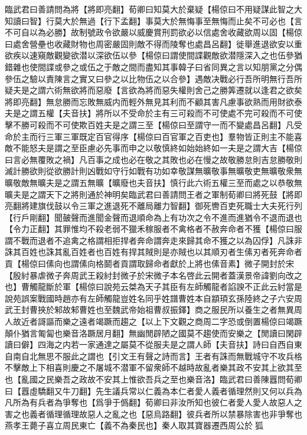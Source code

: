 臨武君曰善請問為將【將即亮翻】荀卿曰知莫大於棄疑【楊倞曰不用疑謀此智之大知讀曰智】行莫大於無過【行下孟翻】事莫大於無悔事至無悔而止矣不可必也【言不可自以為必勝】故制號政令欲嚴以威慶賞刑罰欲必以信處舍收藏欲周以固【楊倞曰處舍營壘也收藏財物也周密嚴固則敵不得而陵奪也處昌呂翻】徙舉進退欲安以重欲疾以速窺敵觀變欲潜以深欲伍以參【楊倞曰謂使間諜觀敵欲潜隱深入之也伍參猶錯雜也使間諜或參之或伍之于敵之間而盡知其事韓子曰省同異之言以知朋黨之分偶參伍之驗以責陳言之實又曰參之以比物伍之以合參】遇敵决戰必行吾所明無行吾所疑夫是之謂六術無欲將而惡廢【言欲為將而惡失權則舍己之勝筭遷就以逢君之欲矣將即亮翻】無怠勝而忘敗無威内而輕外無見其利而不顧其害凡慮事欲熟而用財欲泰夫是之謂五權【夫音扶】將所以不受命於主有三可殺而不可使處不完可殺而不可使擊不勝可殺而不可使欺百姓夫是之謂三至【楊倞曰至謂守一而不變處昌呂翻】凡受命於主而行三軍三軍既定百官得序【楊倞曰百官軍之百吏也】羣物皆正則主不能喜敵不能怒夫是謂之至臣慮必先事而申之以敬慎終如始始終如一夫是之謂大吉【楊倞曰言必無覆敗之禍】凡百事之成也必在敬之其敗也必在慢之故敬勝怠則吉怠勝敬則滅計勝欲則從欲勝計則凶戰如守行如戰有功如幸敬謀無曠敬事無曠敬吏無曠敬衆無曠敬敵無曠夫是之謂五無曠【曠廢也夫音扶】慎行此六術五權三至而處之以恭敬無曠夫是之謂天下之將則通於神明矣臨武君曰善請問王者之軍制荀卿曰將死鼓【將即亮翻將建旗伐鼓以令三軍之進退死不離局離力智翻】御死轡百吏死職士大夫死行列【行戶剛翻】聞皷聲而進聞金聲而退順命為上有功次之令不進而進猶令不退而退也【令力正翻】其罪惟均不殺老弱不獵禾稼服者不禽格者不赦奔命者不獲【楊倞曰服謂不戰而退者不追禽之格謂相拒捍者奔命謂奔走來歸其命不獲之以為囚俘】凡誅非誅其百姓也誅其亂百姓者也百姓有捍其賊則是亦賊也以其順刃者生傃刃者死奔命者貢【楊倞曰傃向也謂傃向格鬬者貢謂取歸命者獻於上將也傃音素】微子開封於宋【殷紂暴虐微子奔周武王殺紂封微子於宋微子本名啓此云開者蓋漢景帝諱劉向改之也】曹觸龍斷於軍【楊倞曰說苑云桀為天子其臣有左師觸龍者諂諛不正此云紂當是說苑誤案戰國時趙亦有左師觸龍豈姓名同乎姓譜曹姓本自顓頊玄孫陸終之子六安周武王封曹挾於邾故邾曹姓也至魏武帝始祖曹叔振鐸】商之服民所以養生之者無異周人故近者謌謳而樂之遠者竭蹶而趨之【以上下文觀之商周二字恐或倒置楊倞曰竭蹶顛仆猶言匍匐也樂音洛蹶居月翻】無幽閒辟陋之國莫不趨使而安樂之【閒讀曰閑辟讀曰僻】四海之内若一家通達之屬莫不從服夫是之謂人師【夫音扶】詩曰自西自東自南自北無思不服此之謂也【引文王有聲之詩而言】王者有誅而無戰城守不攻兵格不擊敵上下相喜則慶之不屠城不潜軍不留衆師不越時故亂者樂其政不安其上欲其至也【亂國之民樂吾之政故不安其上惟欲吾兵之至也樂音洛】臨武君曰善陳囂問荀卿曰【囂虛驕翻又牛刀翻】先生議兵常以仁義為本仁者愛人義者循理然則又何以兵為凡所為有兵者為爭奪也【爲爭于僞翻】荀卿曰非汝所知也彼仁者愛人愛人故惡人之害之也義者循理循理故惡人之亂之也【惡烏路翻】彼兵者所以禁暴除害也非爭奪也　燕孝王薨子喜立周民東亡【義不為秦民也】秦人取其寶器遷西周公於狐

